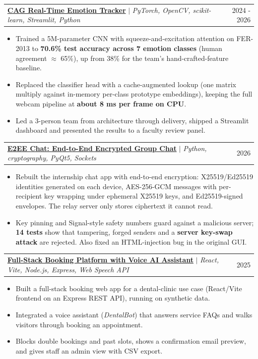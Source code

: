 \documentclass[letterpaper,11pt]{article}
\makeatletter
\newcommand{\resumeItem}[1]{\item\small{#1 \vspace{-2pt}}}
\newcommand{\resumeProjectHeading}[2]{
    \item
    \begin{tabular*}{0.97\textwidth}{l@{\extracolsep{\fill}}r}
      \small#1 & #2 \\
    \end{tabular*}\vspace{-7pt}
}
\newcommand{\resumeItemListStart}{\begin{itemize}[label={\scriptsize\textbullet}]}
\newcommand{\resumeItemListEnd}{\end{itemize}\vspace{-5pt}}
\makeatother
\begin{document}
      \resumeProjectHeading
          {\textbf{\href{https://github.com/Akhil-Prasad09/cag-emotion-tracker}{CAG Real-Time Emotion Tracker}} $|$ \emph{PyTorch, OpenCV, scikit-learn, Streamlit, Python}}{2024 - 2026}
          \resumeItemListStart
            \resumeItem{Trained a 5M-parameter CNN with squeeze-and-excitation attention on FER-2013 to \textbf{70.6\% test accuracy across 7 emotion
classes} (human agreement $\approx$ 65\%), up from 38\% for the team's hand-crafted-feature baseline.}
            \resumeItem{Replaced the classifier head with a cache-augmented lookup (one matrix multiply against in-memory per-class prototype
embeddings), keeping the full webcam pipeline at \textbf{about 8 ms per frame on CPU}.}
            \resumeItem{Led a 3-person team from architecture through delivery, shipped a Streamlit dashboard and presented the results to a faculty
review panel.}
          \resumeItemListEnd

      \resumeProjectHeading
          {\textbf{\href{https://github.com/Akhil-Prasad09/e2ee-chat}{E2EE Chat: End-to-End Encrypted Group Chat}} $|$ \emph{Python, cryptography, PyQt5, Sockets}}{2026}
          \resumeItemListStart
            \resumeItem{Rebuilt the internship chat app with end-to-end encryption: X25519/Ed25519 identities generated on each device, AES-256-GCM
messages with per-recipient key wrapping under ephemeral X25519 keys, and Ed25519-signed envelopes. The relay server only stores
ciphertext it cannot read.}
            \resumeItem{Key pinning and Signal-style safety numbers guard against a malicious server; \textbf{14 tests} show that tampering, forged
senders and a \textbf{server key-swap attack} are rejected. Also fixed an HTML-injection bug in the original GUI.}
          \resumeItemListEnd

      \resumeProjectHeading
          {\textbf{\href{https://akhil-prasad09.github.io/clinic-booking-voice/}{Full-Stack Booking Platform with Voice AI Assistant}} $|$ \emph{React, Vite, Node.js, Express, Web Speech API}}{2025}
          \resumeItemListStart
            \resumeItem{Built a full-stack booking web app for a dental-clinic use case (React/Vite frontend on an Express REST API),
running on synthetic data.}
            \resumeItem{Integrated a voice assistant (\emph{DentalBot}) that answers service FAQs and walks visitors through booking an appointment.}
            \resumeItem{Blocks double bookings and past slots, shows a confirmation email preview, and gives staff an admin view with CSV export.}
          \resumeItemListEnd
\end{document}
